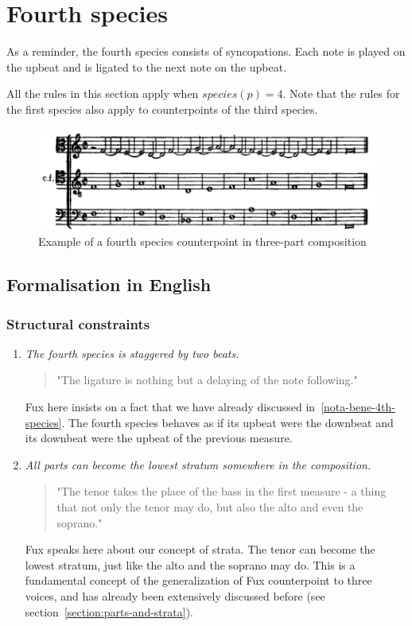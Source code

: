 \section{Fourth species}
As a reminder, the fourth species consists of syncopations. Each note is played on the upbeat and is ligated to the next note on the upbeat.

All the rules in this section apply when $species(p) =4$. Note that the rules for the first species also apply to counterpoints of the third species.

\begin{figure}[h]
    \centering
    \includegraphics[width=1\textwidth]{Images/Species_examples/4sp-example.png}
    \caption{Example of a fourth species counterpoint in three-part composition}
    \label{fig:example-4sp}
\end{figure}

\subsection{Formalisation in English}\label{formalisation-en-4th}
\subsubsection{Structural constraints}
\begin{enumerate}[wide, label=\bfseries 4.S\arabic*]
\setcounter{enumi}{0}
    \item \textit{The fourth species is staggered by two beats.} \label{rule:delaying}    
    \begin{quotation}
        "The ligature is nothing but a delaying of the note following."
        \textcite[p.95]{GaPEng}
    \end{quotation}
    Fux here insists on a fact that we have already discussed in~\ref{nota-bene-4th-species}. The fourth species behaves as if its upbeat were the downbeat and its downbeat were the upbeat of the previous measure.

    \item \textit{All parts can become the lowest stratum somewhere in the composition.} \label{rule:tenor-might-take-place-of-bass}    
    \begin{quotation}
        "The tenor takes the place of the bass in the first measure - a thing that not only the tenor may do, but also the alto and even the soprano."
        \textcite[p.100]{GaPEng}
    \end{quotation}
    Fux speaks here about our concept of strata. The tenor can become the lowest stratum, just like the alto and the soprano may do. This is a fundamental concept of the generalization of Fux counterpoint to three voices, and has already been extensively discussed before (see section~\ref{section:parts-and-strata}).
\end{enumerate}

